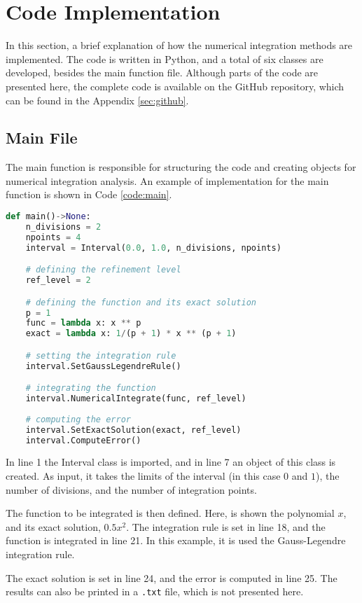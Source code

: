 \section{Code Implementation} \label{sec:code-implementation}
In this section, a brief explanation of how the numerical integration methods are implemented. The code is written in Python, and a total of six classes are developed, besides the main function file. Although parts of the code are presented here, the complete code is available on the GitHub repository, which can be found in the Appendix \ref{sec:github}.

\subsection{Main File}
The main function is responsible for structuring the code and creating objects for numerical integration analysis. An example of implementation for the main function is shown in Code \ref{code:main}.
\begin{lstlisting}[language=Python, caption={Main function.}, label={code:main}] 
def main()->None:
    n_divisions = 2
    npoints = 4
    interval = Interval(0.0, 1.0, n_divisions, npoints)

    # defining the refinement level
    ref_level = 2

    # defining the function and its exact solution
    p = 1
    func = lambda x: x ** p
    exact = lambda x: 1/(p + 1) * x ** (p + 1)

    # setting the integration rule
    interval.SetGaussLegendreRule()

    # integrating the function
    interval.NumericalIntegrate(func, ref_level)
    
    # computing the error
    interval.SetExactSolution(exact, ref_level)
    interval.ComputeError()
\end{lstlisting}

In line 1 the Interval class is imported, and in line 7 an object of this class is created. As input, it takes the limits of the interval (in this case $0$ and $1$), the number of divisions, and the number of integration points. 

The function to be integrated is then defined. Here, is shown the polynomial $x$, and its exact solution, $0.5x^2$. The integration rule is set in line 18, and the function is integrated in line 21. In this example, it is used the Gauss-Legendre integration rule. 

The exact solution is set in line 24, and the error is computed in line 25. The results can also be printed in a \texttt{.txt} file, which is not presented here.

